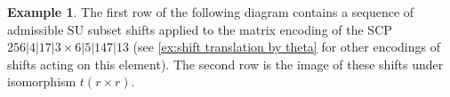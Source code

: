 \documentclass{amsart}
\theoremstyle{definition}
\newtheorem{example}[theorem]{Example}
\newcommand{\SU}{\mathrm{SU}}
\begin{document}
\begin{example}
The first row of the following diagram contains a sequence of admissible $\SU$ subset shifts applied to the matrix encoding of the SCP $256|4|17|3\times 6|5|147|13$ (see \cref{ex:shift translation by theta} for other encodings of shifts acting on this element). 
The second row is the image of these shifts under isomorphism $t(r\times r)$.
\begin{center}
{\footnotesize
{}}
\end{center}
\end{example}
\end{document}
